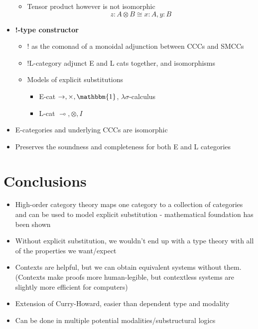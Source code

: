 \documentclass[11pt]{article}
\begin{document}
\begin{itemize}
\begin{itemize}
            \item Tensor product however is not isomorphic \[z: A \otimes B \cong x : A, y : B\]
        \end{itemize}
    \item \textbf{!-type constructor}        
        \begin{itemize}
            \item ! as the comonad of a monoidal adjunction between CCCs and SMCCs\cite{Benton1994LinearNonLinear}
            \item !L-category adjunct E and L cats together, and isomorphisms
            \item Models of explicit substitutions
                \begin{itemize}
                    \item E-cat $\to, \times, \mathbbm{1}$, $\lambda\sigma$-calculus
                    \item L-cat $\multimap, \otimes, I$
                \end{itemize}
        \end{itemize}
    \item E-categories and underlying CCCs are isomorphic
    \item Preserves the soundness and completeness for both E and L categories
\end{itemize}

\section{Conclusions}
\begin{itemize}
    \item High-order category theory maps one category to a collection of categories and can be used to model explicit substitution - mathematical foundation has been shown
    \item Without explicit substitution, we wouldn't end up with a type theory with all of the properties we want/expect
    \item Contexts are helpful, but we can obtain equivalent systems without them. (Contexts make proofs more human-legible, but contextless systems are slightly more efficient for computers)
    \item Extension of Curry-Howard, easier than dependent type and modality
    \item Can be done in multiple potential modalities/substructural logics
\end{itemize}

\newpage
\printbibliography[heading=bibintoc]
\end{document}
